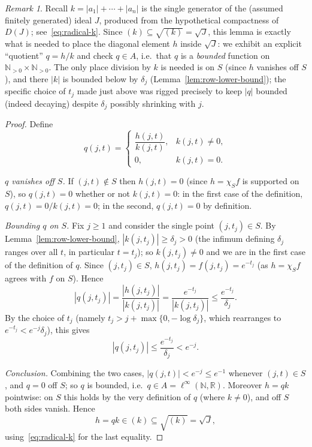 \documentclass{amsart}
\theoremstyle{definition}
\theoremstyle{remark}
\newtheorem{remark}[theorem]{Remark}
\newcommand{\nat}{\mathbb N}
\newcommand{\reals}{\mathbb R}
\newcommand{\linfty}{\ell^\infty}
\begin{document}
\begin{remark}
Recall $k=|a_1|+\cdots+|a_n|$ is the single generator of the (assumed
finitely generated) ideal $J$, produced from the hypothetical
compactness of $D(J)$; see~\eqref{eq:radical-k}. Since
$(k)\subseteq\sqrt{(k)}=\sqrt J$, this lemma is exactly what is needed
to place the diagonal element $h$ inside $\sqrt J$: we exhibit an
explicit ``quotient'' $q=h/k$ and check $q\in A$, i.e.\ that $q$ is a
\emph{bounded} function on $\nat_{>0}\times\nat_{>0}$. The only place
division by $k$ is needed is on $S$ (since $h$ vanishes off $S$), and
there $|k|$ is bounded below by $\delta_j$
(Lemma~\ref{lem:row-lower-bound}); the specific choice of $t_j$ made
just above was rigged precisely to keep $|q|$ bounded (indeed decaying)
despite $\delta_j$ possibly shrinking with $j$.
\end{remark}

\begin{proof}
Define
\[
q(j,t)=
\begin{cases}
\dfrac{h(j,t)}{k(j,t)},&k(j,t)\neq0,\\[1ex]
0,&k(j,t)=0.
\end{cases}
\]

\emph{$q$ vanishes off $S$.} If $(j,t)\notin S$ then $h(j,t)=0$
(since $h=\chi_Sf$ is supported on $S$), so $q(j,t)=0$ whether or not
$k(j,t)=0$: in the first case of the definition, $q(j,t)=0/k(j,t)=0$;
in the second, $q(j,t)=0$ by definition.

\emph{Bounding $q$ on $S$.} Fix $j\geq1$ and consider the single point
$(j,t_j)\in S$. By Lemma~\ref{lem:row-lower-bound}, $|k(j,t_j)|\geq
\delta_j>0$ (the infimum defining $\delta_j$ ranges over all $t$, in
particular $t=t_j$); so $k(j,t_j)\neq0$ and we are in the first case of
the definition of $q$. Since $(j,t_j)\in S$, $h(j,t_j)=f(j,t_j)=e^{-t_j}$
(as $h=\chi_Sf$ agrees with $f$ on $S$). Hence
\[
|q(j,t_j)|
=\frac{|h(j,t_j)|}{|k(j,t_j)|}
=\frac{e^{-t_j}}{|k(j,t_j)|}
\leq\frac{e^{-t_j}}{\delta_j}.
\]
By the choice of $t_j$ (namely $t_j>j+\max\{0,-\log\delta_j\}$, which
rearranges to $e^{-t_j}<e^{-j}\delta_j$), this gives
\[
|q(j,t_j)|
\leq\frac{e^{-t_j}}{\delta_j}
<e^{-j}.
\]

\emph{Conclusion.} Combining the two cases, $|q(j,t)|<e^{-j}\leq e^{-1}$
whenever $(j,t)\in S$, and $q=0$ off $S$; so $q$ is bounded, i.e.\
$q\in A=\linfty(\nat,\reals)$. Moreover $h=qk$ pointwise: on $S$ this
holds by the very definition of $q$ (where $k\neq0$), and off $S$ both
sides vanish. Hence
\[
h=qk\in(k)\subseteq\sqrt{(k)}=\sqrt J,
\]
using~\eqref{eq:radical-k} for the last equality.
\end{proof}
\end{document}
